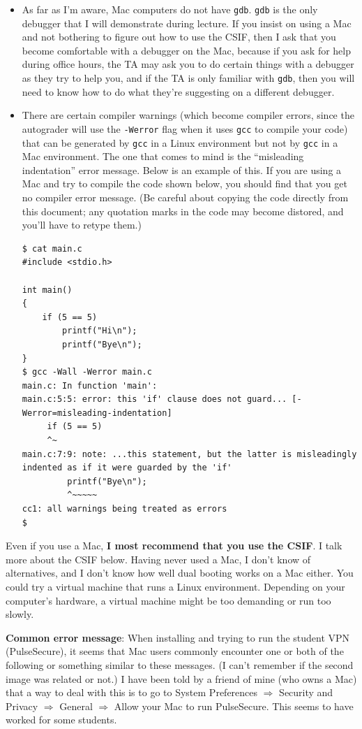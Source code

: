 \documentclass{article}
\begin{document}
\begin{itemize}[itemsep=0mm, parsep=0pt]
\item As far as I'm aware, Mac computers do not have \lstinline{gdb}. \lstinline{gdb} is the only debugger that I will demonstrate during lecture. If you insist on using a Mac and not bothering to figure out how to use the CSIF, then I ask that you become comfortable with a debugger on the Mac, because if you ask for help during office hours, the TA may ask you to do certain things with a debugger as they try to help you, and if the TA is only familiar with \lstinline{gdb}, then you will need to know how to do what they're suggesting on a different debugger.
\item There are certain compiler warnings (which become compiler errors, since the autograder will use the \lstinline{-Werror} flag when it uses \lstinline{gcc} to compile your code) that can be generated by \lstinline{gcc} in a Linux environment but not by \lstinline{gcc} in a Mac environment. The one that comes to mind is the ``misleading indentation'' error message. Below is an example of this. If you are using a Mac and try to compile the code shown below, you should find that you get no compiler error message. (Be careful about copying the code directly from this document; any quotation marks in the code may become distored, and you'll have to retype them.)

\begin{lstlisting}
$ cat main.c 
#include <stdio.h>

int main()
{
    if (5 == 5)
        printf("Hi\n");
        printf("Bye\n");
}
$ gcc -Wall -Werror main.c 
main.c: In function 'main':
main.c:5:5: error: this 'if' clause does not guard... [-Werror=misleading-indentation]
     if (5 == 5)
     ^~
main.c:7:9: note: ...this statement, but the latter is misleadingly indented as if it were guarded by the 'if'
         printf("Bye\n");
         ^~~~~~
cc1: all warnings being treated as errors
$ 
\end{lstlisting}
\end{itemize}

Even if you use a Mac, \textbf{I most recommend that you use the CSIF}. I talk more about the CSIF below. Having never used a Mac, I don't know of alternatives, and I don't know how well dual booting works on a Mac either. You could try a virtual machine that runs a Linux environment. Depending on your computer's hardware, a virtual machine might be too demanding or run too slowly.

\textbf{Common error message}: When installing and trying to run the student VPN (PulseSecure), it seems that Mac users commonly encounter one or both of the following or something similar to these messages. (I can't remember if the second image was related or not.) I have been told by a friend of mine (who owns a Mac) that a way to deal with this is to go to System Preferences $\Rightarrow$ Security and Privacy $\Rightarrow$ General $\Rightarrow$ Allow your Mac to run PulseSecure. This seems to have worked for some students.\\
\end{document}

